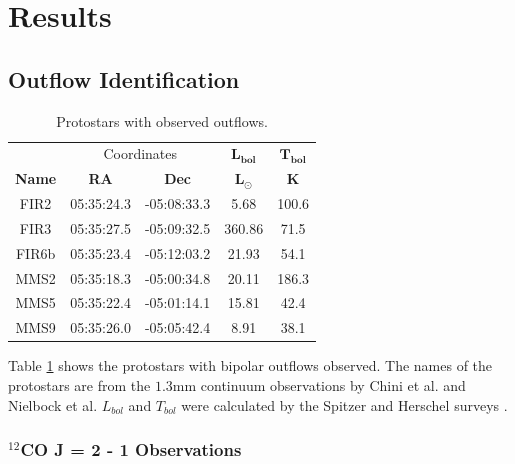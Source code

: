 \section{Results}


\subsection{Outflow Identification}

\begin{table}[h!]
	\caption{Protostars with observed outflows.}
	\label{table:protostars}
	\begin{center}
		\begin{tabular}{c|c|c|c|c}
			\toprule
			& \multicolumn{2}{c|}{Coordinates} & $\mathbf{L_{bol}}$ & $\mathbf{T_{bol}}$\\
			\textbf{Name} & \textbf{RA} & \textbf{Dec} & $\mathbf{L_{\odot}}$ & $\mathbf{K}$\\
			\midrule
			\centering
			FIR2 & 05:35:24.3 & -05:08:33.3 & 5.68 & 100.6\\
			FIR3 & 05:35:27.5 & -05:09:32.5 & 360.86 & 71.5\\
			FIR6b & 05:35:23.4 & -05:12:03.2 & 21.93 & 54.1\\
			MMS2 & 05:35:18.3 & -05:00:34.8 & 20.11 & 186.3\\
			MMS5 & 05:35:22.4 & -05:01:14.1 & 15.81 & 42.4\\
			MMS9 & 05:35:26.0 & -05:05:42.4 & 8.91 & 38.1\\
			\midrule
		\end{tabular}
	\end{center}
\end{table}

Table \ref{table:protostars} shows the protostars with bipolar outflows observed. The names of the protostars are from the $1.3\textrm{mm}$ continuum observations by Chini et al. \cite{chini1997dust} and Nielbock et al. \cite{nielbock2003stellar} $L_{bol}$ and $T_{bol}$ were calculated by the Spitzer and Herschel surveys \cite{megeath2012spitzer, furlan2016herschel}.

\newpage
\subsubsection{$^{12}$CO J = 2 - 1 Observations}

